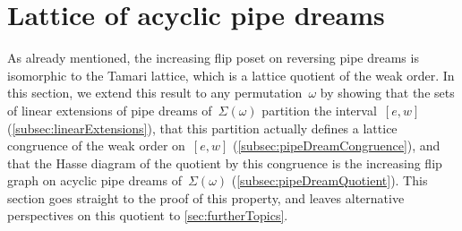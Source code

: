 \documentclass[reqno]{amsart}
\newtheorem{lemma}[theorem]{Lemma}
\theoremstyle{definition}
\newcommand{\vincent}[1]{\todo[color=blue!30]{#1 \\ \hfill --- V.}}
\newcommand{\contact}{^\#} %
\newcommand{\acyclicPipeDreams}{\Sigma} %
\newcommand{\less}{\vartriangleleft} %
\newcommand{\more}{\vartriangleright} %
\newcommand{\contactLess}[1]{\less_{#1}} %
\newcommand{\contactMore}[1]{\more_{#1}} %
\begin{document}
%


\section{Lattice of acyclic pipe dreams}
\label{sec:latticeAcyclicPipeDreams}

As already mentioned, the increasing flip poset on reversing pipe dreams is isomorphic to the Tamari lattice, which is a lattice quotient of the weak order.
In this section, we extend this result to any permutation~$\omega$ by showing that the sets of linear extensions of pipe dreams of~$\acyclicPipeDreams(\omega)$ partition the interval~$[e,w]$ (\cref{subsec:linearExtensions}), that this partition actually defines a lattice congruence of the weak order on~$[e,w]$ (\cref{subsec:pipeDreamCongruence}), and that the Hasse diagram of the quotient by this congruence is the increasing flip graph on acyclic pipe dreams of~$\acyclicPipeDreams(\omega)$ (\cref{subsec:pipeDreamQuotient}).
This section goes straight to the proof of this property, and leaves alternative perspectives on this quotient to \cref{sec:furtherTopics}.

\end{document}
